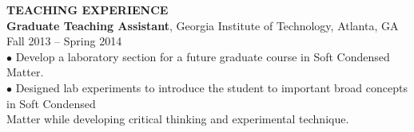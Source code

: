 \documentclass[10pt]{article}
\begin{document}








\textbf{\large TEACHING EXPERIENCE} \\
{\bf Graduate Teaching Assistant}, Georgia Institute of Technology, Atlanta, GA \hfill Fall 2013 -- Spring 2014\\
\hspace*{10pt}$\bullet$ Develop a laboratory section for a future graduate course in Soft Condensed Matter.  \\
\hspace*{10pt}$\bullet$ Designed lab experiments to introduce the student to important broad concepts in Soft Condensed \\ \hspace*{15pt} Matter while developing critical thinking and experimental technique.  \\
\end{document}
